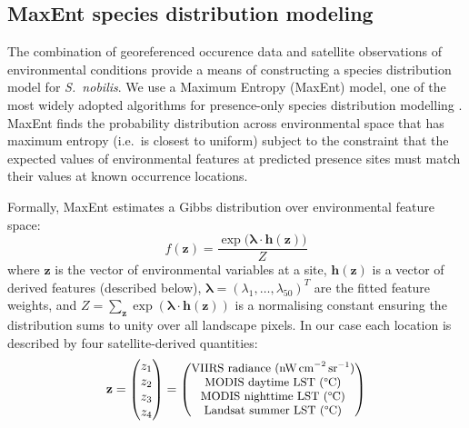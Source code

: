 \documentclass[11pt, a4paper, twocolumn]{article}
\begin{document}


\subsection{MaxEnt species distribution modeling}

The combination of georeferenced occurence data and satellite observations of environmental conditions provide
a means of constructing a species distribution model for \textit{S.~nobilis}.
We use a Maximum Entropy (MaxEnt) model, one of the most widely adopted algorithms for 
presence-only species distribution modelling \citep{Phillips2006, Phillips2008, Elith2011}. 
MaxEnt finds the probability distribution across environmental space that has maximum entropy 
(i.e.\ is closest to uniform) subject to the constraint that the expected values of environmental 
features at predicted presence sites must match their values at known occurrence locations. 

Formally, MaxEnt estimates a Gibbs distribution over environmental feature space:
\begin{equation}
f(\mathbf{z}) = \frac{\exp\!\bigl(\boldsymbol{\lambda} \cdot \mathbf{h}(\mathbf{z})\bigr)}{Z}
\label{eq:maxent}
\end{equation}
where $\mathbf{z}$ is the vector of environmental variables at a site, $\mathbf{h}(\mathbf{z})$ is a vector of derived features (described below), $\boldsymbol{\lambda} = (\lambda_1, \ldots, \lambda_{50})^{T}$ are the fitted feature weights, and $Z = \sum_{\mathbf{z}} \exp(\boldsymbol{\lambda} \cdot \mathbf{h}(\mathbf{z}))$ is a normalising constant ensuring the distribution sums to unity over all landscape pixels. In our case each location is described by four satellite-derived quantities:
\begin{equation}
\mathbf{z} = \begin{pmatrix} z_1 \\ z_2 \\ z_3 \\ z_4 \end{pmatrix} = {\small\begin{pmatrix} \text{VIIRS radiance (nW\,cm}^{-2}\,\text{sr}^{-1}\text{)} \\ \text{MODIS daytime LST (\textdegree C)} \\ \text{MODIS nighttime LST (\textdegree C)} \\ \text{Landsat summer LST (\textdegree C)} \end{pmatrix}}
\label{eq:zvec}
\end{equation}
\end{document}
